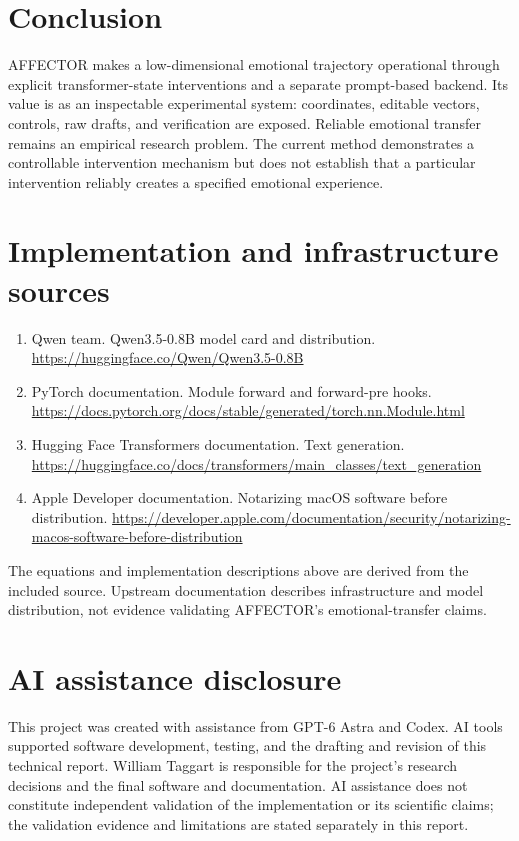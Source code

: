 \documentclass[manuscript,screen,nonacm]{acmart}
\begin{document}
\section{Conclusion}\label{conclusion}

AFFECTOR makes a low-dimensional emotional trajectory operational
through explicit transformer-state interventions and a separate
prompt-based backend. Its value is as an inspectable experimental
system: coordinates, editable vectors, controls, raw drafts, and
verification are exposed. Reliable emotional transfer remains an
empirical research problem. The current method demonstrates a
controllable intervention mechanism but does not establish that a
particular intervention reliably creates a specified emotional
experience.

\section{Implementation and infrastructure
sources}\label{implementation-and-infrastructure-sources}

\begin{enumerate}
\def\labelenumi{\arabic{enumi}.}
\item
  Qwen team. Qwen3.5-0.8B model card and distribution.
  \url{https://huggingface.co/Qwen/Qwen3.5-0.8B}
\item
  PyTorch documentation. Module forward and forward-pre hooks.
  \url{https://docs.pytorch.org/docs/stable/generated/torch.nn.Module.html}
\item
  Hugging Face Transformers documentation. Text generation.
  \url{https://huggingface.co/docs/transformers/main_classes/text_generation}
\item
  Apple Developer documentation. Notarizing macOS software before
  distribution.
  \url{https://developer.apple.com/documentation/security/notarizing-macos-software-before-distribution}
\end{enumerate}

The equations and implementation descriptions above are derived from the
included source. Upstream documentation describes infrastructure and
model distribution, not evidence validating AFFECTOR's
emotional-transfer claims.

\section*{AI assistance disclosure}
This project was created with assistance from GPT-6 Astra and Codex. AI
tools supported software development, testing, and the drafting and
revision of this technical report. William Taggart is responsible for
the project's research decisions and the final software and
documentation. AI assistance does not constitute independent validation
of the implementation or its scientific claims; the validation evidence
and limitations are stated separately in this report.
\end{document}
